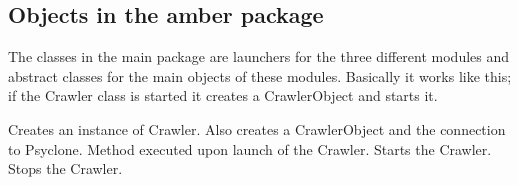\subsection{Objects in the amber package}

The classes in the main package are launchers for the three different modules
and abstract classes for the main objects of these modules. Basically it works
like this; if the Crawler class is started it creates a CrawlerObject and
starts it.


\begin{classmetadata}
\end{classmetadata}

\begin{interface}
    {Creates an instance of Crawler. Also creates a CrawlerObject and the
      connection to Psyclone.}
    {Method executed upon launch of the Crawler.}
    {Starts the Crawler.}
    {Stops the Crawler.}
\end{interface}




\begin{classmetadata}
\end{classmetadata}




\begin{classmetadata}
\end{classmetadata}




\begin{classmetadata}
\end{classmetadata}

